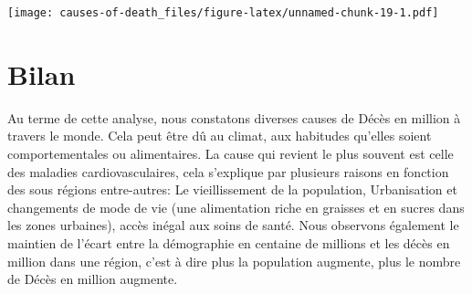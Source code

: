 \documentclass[
]{article}
\begin{document}
\texttt{[image: causes-of-death\_files/figure-latex/unnamed-chunk-19-1.pdf]}

\hypertarget{bilan}{%
\section{Bilan}\label{bilan}}

Au terme de cette analyse, nous constatons diverses causes de Décès en
million à travers le monde. Cela peut être dû au climat, aux habitudes
qu'elles soient comportementales ou alimentaires. La cause qui revient
le plus souvent est celle des maladies cardiovasculaires, cela
s'explique par plusieurs raisons en fonction des sous régions
entre-autres: Le vieillissement de la population, Urbanisation et
changements de mode de vie (une alimentation riche en graisses et en
sucres dans les zones urbaines), accès inégal aux soins de santé. Nous
observons également le maintien de l'écart entre la démographie en
centaine de millions et les décès en million dans une région, c'est à
dire plus la population augmente, plus le nombre de Décès en million
augmente.
\end{document}
